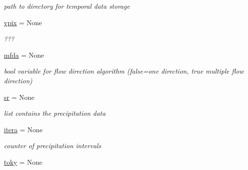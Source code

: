 \begin{DoxyCompactItemize}
\begin{DoxyCompactList}\small\item\em path to directory for temporal data storage \end{DoxyCompactList}\item 
\hypertarget{classmain__src_1_1main__classes_1_1General_1_1Globals_a6b078e9602987dc576d82c5b0b6130e8}{\hyperlink{classmain__src_1_1main__classes_1_1General_1_1Globals_a6b078e9602987dc576d82c5b0b6130e8}{vpix} = None}\label{classmain__src_1_1main__classes_1_1General_1_1Globals_a6b078e9602987dc576d82c5b0b6130e8}

\begin{DoxyCompactList}\small\item\em ??? \end{DoxyCompactList}\item 
\hypertarget{classmain__src_1_1main__classes_1_1General_1_1Globals_abd8e449af701650e60ff5c5e94cfec6b}{\hyperlink{classmain__src_1_1main__classes_1_1General_1_1Globals_abd8e449af701650e60ff5c5e94cfec6b}{mfda} = None}\label{classmain__src_1_1main__classes_1_1General_1_1Globals_abd8e449af701650e60ff5c5e94cfec6b}

\begin{DoxyCompactList}\small\item\em bool variable for flow direction algorithm (false=one direction, true multiple flow direction) \end{DoxyCompactList}\item 
\hypertarget{classmain__src_1_1main__classes_1_1General_1_1Globals_aab025cb45583061b099cf8a09578ef66}{\hyperlink{classmain__src_1_1main__classes_1_1General_1_1Globals_aab025cb45583061b099cf8a09578ef66}{sr} = None}\label{classmain__src_1_1main__classes_1_1General_1_1Globals_aab025cb45583061b099cf8a09578ef66}

\begin{DoxyCompactList}\small\item\em list contains the precipitation data \end{DoxyCompactList}\item 
\hypertarget{classmain__src_1_1main__classes_1_1General_1_1Globals_a233af58806a475931bef718958ad4c70}{\hyperlink{classmain__src_1_1main__classes_1_1General_1_1Globals_a233af58806a475931bef718958ad4c70}{itera} = None}\label{classmain__src_1_1main__classes_1_1General_1_1Globals_a233af58806a475931bef718958ad4c70}

\begin{DoxyCompactList}\small\item\em counter of precipitation intervals \end{DoxyCompactList}\item 
\hypertarget{classmain__src_1_1main__classes_1_1General_1_1Globals_a377bdacfc9ff3d42151d5e349d265c42}{\hyperlink{classmain__src_1_1main__classes_1_1General_1_1Globals_a377bdacfc9ff3d42151d5e349d265c42}{toky} = None}\label{classmain__src_1_1main__classes_1_1General_1_1Globals_a377bdacfc9ff3d42151d5e349d265c42}


\end{DoxyCompactItemize}
